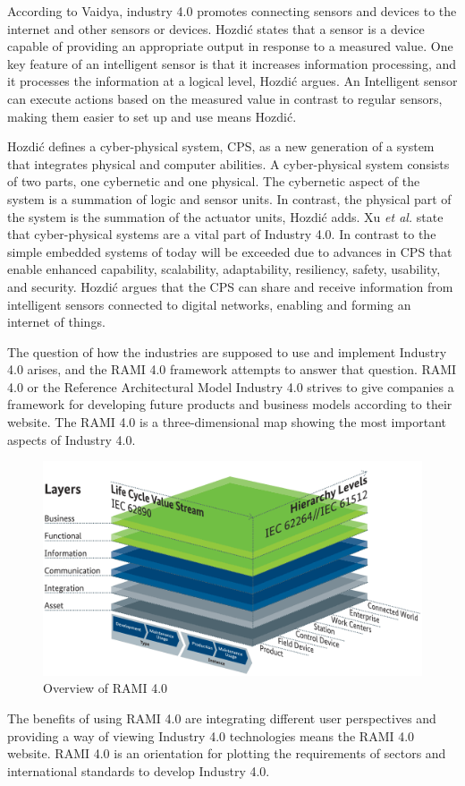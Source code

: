 According to Vaidya, industry 4.0 promotes connecting sensors and devices to the internet and other sensors or devices\cite{Vaidya2018}.
Hozdić states that a sensor is a device capable of providing an appropriate output in response to a measured value\cite{Hozdic2015}.
One key feature of an intelligent sensor is that it increases information processing, and it processes the information at a logical level, Hozdić argues.
An Intelligent sensor can execute actions based on the measured value in contrast to regular sensors, making them easier to set up and use means Hozdić. 

Hozdić defines a cyber-physical system, CPS, as a new generation of a system that integrates physical and computer abilities\cite{Hozdic2015}.
A cyber-physical system consists of two parts, one cybernetic and one physical.
The cybernetic aspect of the system is a summation of logic and sensor units. In contrast, the physical part of the system is the summation of the actuator units, Hozdić adds.
Xu \textit{et al.} state that cyber-physical systems are a vital part of Industry 4.0. In contrast to the simple embedded systems of today will be exceeded due to advances in CPS that enable enhanced capability, scalability, adaptability, resiliency, safety, usability, and security\cite{Xu2018}.
Hozdić argues that the CPS can share and receive information from intelligent sensors connected to digital networks, enabling and forming an internet of things.

The question of how the industries are supposed to use and implement Industry 4.0 arises, and the RAMI 4.0 framework attempts to answer that question.
RAMI 4.0 or the Reference Architectural Model Industry 4.0 strives to give companies a framework for developing future products and business models according to their website\cite{RAMI2021}.
The RAMI 4.0 is a three-dimensional map showing the most important aspects of Industry 4.0. 
\begin{figure}[H]
    \centering
    \includegraphics[width=\textwidth]{Pictures/RAMI.png} 
    \caption{Overview of RAMI 4.0 \cite{RAMI4.0}}
    \label{RAMI4.0}
\end{figure}
The benefits of using RAMI 4.0 are integrating different user perspectives and providing a way of viewing Industry 4.0 technologies means the RAMI 4.0 website.
RAMI 4.0 is an orientation for plotting the requirements of sectors and international standards to develop Industry 4.0.

